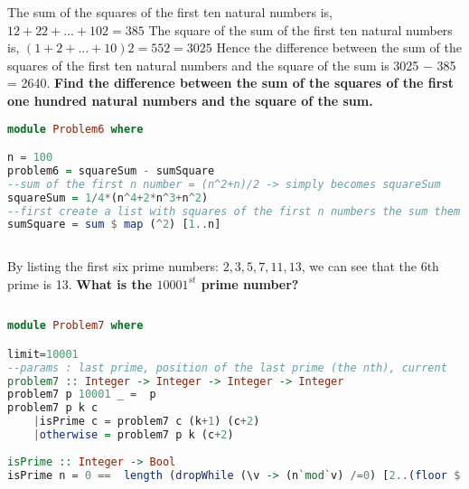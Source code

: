 \begin{problem}
The sum of the squares of the first ten natural numbers is, $12 + 22 + ... + 102 = 385$
The square of the sum of the first ten natural numbers is, $(1 + 2 + ... + 10)2 = 552 = 3025$
Hence the difference between the sum of the squares of the first ten natural numbers and the square of the sum is 3025 − 385 = 2640.
\textbf{Find the difference between the sum of the squares of the first one hundred natural numbers and the square of the sum.}
\end{problem}	

\begin{solution}

		\begin{lstlisting}[language=Haskell, caption="Haskell"]
module Problem6 where

n = 100
problem6 = squareSum - sumSquare
--sum of the first n number = (n^2+n)/2 -> simply becomes squareSum
squareSum = 1/4*(n^4+2*n^3+n^2)
--first create a list with squares of the first n numbers the sum them up
sumSquare = sum $ map (^2) [1..n]
        

		\end{lstlisting}  

\end{solution}	



\begin{problem}
By listing the first six prime numbers: $2, 3, 5, 7, 11, 13$, we can see that the 6th prime is 13.
\textbf{What is the $10001^{st}$ prime number?}
\end{problem}	

\begin{solution}

		\begin{lstlisting}[language=Haskell, caption="Haskell"]
        
module Problem7 where

limit=10001
--params : last prime, position of the last prime (the nth), current
problem7 :: Integer -> Integer -> Integer -> Integer
problem7 p 10001 _ =  p
problem7 p k c     
    |isPrime c = problem7 c (k+1) (c+2)
    |otherwise = problem7 p k (c+2)
                 
isPrime :: Integer -> Bool
isPrime n = 0 ==  length (dropWhile (\v -> (n`mod`v) /=0) [2..(floor $ sqrt(fromInteger n))])


		\end{lstlisting}  

\end{solution}	


